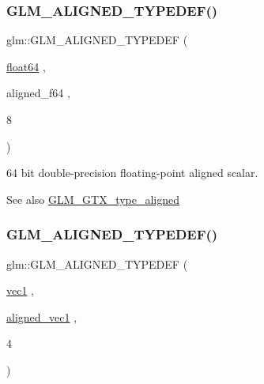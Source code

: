 \subsubsection{\texorpdfstring{G\+L\+M\+\_\+\+A\+L\+I\+G\+N\+E\+D\+\_\+\+T\+Y\+P\+E\+D\+E\+F()}{GLM\_ALIGNED\_TYPEDEF()}\hspace{0.1cm}{\footnotesize\ttfamily [142/209]}}
{\footnotesize\ttfamily glm\+::\+G\+L\+M\+\_\+\+A\+L\+I\+G\+N\+E\+D\+\_\+\+T\+Y\+P\+E\+D\+EF (\begin{DoxyParamCaption}\item[{\hyperlink{group__gtc__type__precision_gab721f828b41f46b20cf4883b50733d3b}{float64}}]{,  }\item[{aligned\+\_\+f64}]{,  }\item[{8}]{ }\end{DoxyParamCaption})}

64 bit double-\/precision floating-\/point aligned scalar. \begin{DoxySeeAlso}{See also}
\hyperlink{group__gtx__type__aligned}{G\+L\+M\+\_\+\+G\+T\+X\+\_\+type\+\_\+aligned} 
\end{DoxySeeAlso}
\mbox{\label{group__gtx__type__aligned_ga81bc497b2bfc6f80bab690c6ee28f0f9}} 
\subsubsection{\texorpdfstring{G\+L\+M\+\_\+\+A\+L\+I\+G\+N\+E\+D\+\_\+\+T\+Y\+P\+E\+D\+E\+F()}{GLM\_ALIGNED\_TYPEDEF()}\hspace{0.1cm}{\footnotesize\ttfamily [143/209]}}
{\footnotesize\ttfamily glm\+::\+G\+L\+M\+\_\+\+A\+L\+I\+G\+N\+E\+D\+\_\+\+T\+Y\+P\+E\+D\+EF (\begin{DoxyParamCaption}\item[{\hyperlink{vec1_8hpp_a16030dae9029ed1eab1553a2183bbb79}{vec1}}]{,  }\item[{\hyperlink{group__gtc__type__aligned_ga8cf75c112dfa39264b7ef65c2ed6b3c4}{aligned\+\_\+vec1}}]{,  }\item[{4}]{ }\end{DoxyParamCaption})}

